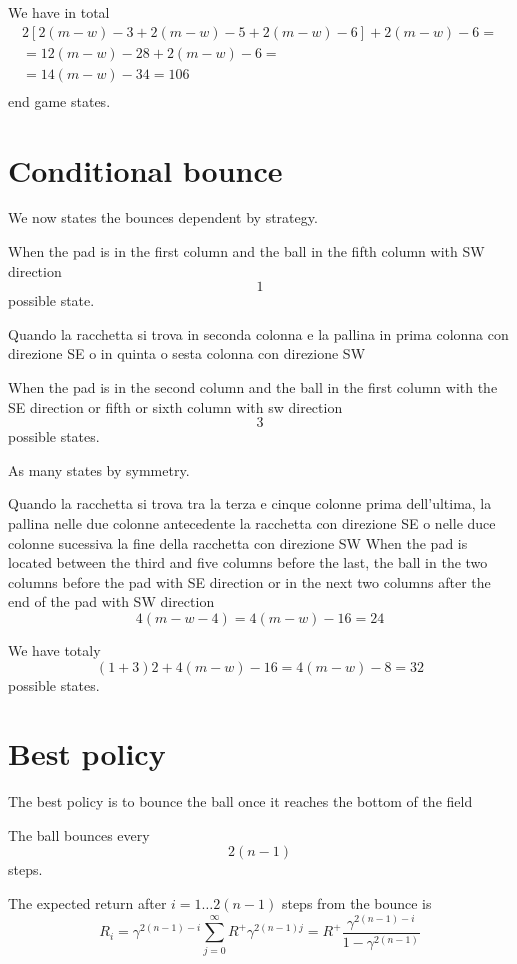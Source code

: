 \documentclass[a4paper,11pt]{article}
\begin{document}
We have in total
\[
\begin{array}{r}
 2[2(m-w)-3+2(m-w)-5+2(m-w)-6]+2(m-w)-6 = \\
 = 12(m-w)-28+2(m-w)-6 = \\
 = 14(m-w)-34 = 106 \\
\end{array}
\]
end game states.


\section{Conditional bounce}

We now states the bounces dependent by strategy.

When the pad is in the first column and the ball in the fifth column with SW direction
\[
1
\]
possible state.

Quando la racchetta si trova in seconda colonna e la pallina in prima colonna con direzione SE o in quinta o sesta colonna con direzione SW

When the pad is in the second column and the ball in the first column with the SE direction or fifth or sixth column with sw direction
\[
3
\]
possible states.

As many states by symmetry.

Quando la racchetta si trova tra la terza e cinque colonne prima dell'ultima, la pallina nelle due colonne antecedente la racchetta
con direzione SE o nelle duce colonne sucessiva la fine della racchetta
con direzione SW
When the pad is located between the third and five columns before the last, the ball in the two columns before the pad with 
SE direction or in the next two columns after the end of the pad
with SW direction
\[
4 (m-w-4)=4(m-w)-16=24
\]

We have totaly 
\[
(1+3)2+4(m-w)-16=4(m-w)-8=32
\]
possible states.


\section{Best policy}

The best policy is to bounce the ball once it reaches the bottom of the field

The ball bounces every
\[
2 (n - 1)
\]
steps.

The expected return after $ i = 1 \dots 2(n-1) $ steps from the bounce is 
\[
R_i = \gamma ^ {2(n-1)-i} \sum_{j=0}^{\infty} R^+ \gamma ^ {2(n-1)j} =
R^+ \frac{ \gamma ^ {2(n-1)-i}}{1-\gamma ^ {2(n-1)}}
\]
\end{document}
